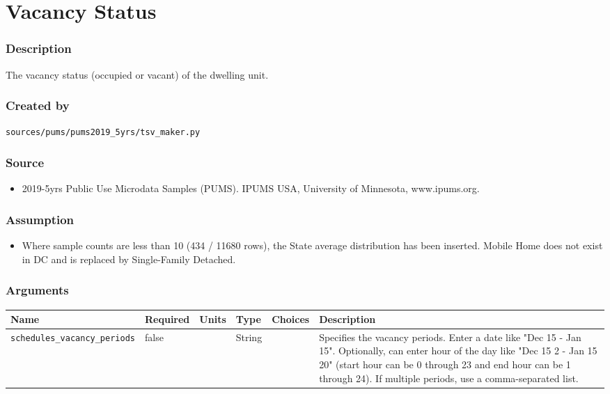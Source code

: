 \section{Vacancy Status}\label{vacancy_status}

\subsubsection{Description}\label{description-142}

The vacancy status (occupied or vacant) of the dwelling unit.

\subsubsection{Created by}\label{created-by-143}

\texttt{sources/pums/pums2019\_5yrs/tsv\_maker.py}

\subsubsection{Source}\label{source-145}

\begin{itemize}
 
\item
  2019-5yrs Public Use Microdata Samples (PUMS). IPUMS USA, University
  of Minnesota, www.ipums.org.
\end{itemize}

\subsubsection{Assumption}\label{assumption-81}

\begin{itemize}
 
\item
  Where sample counts are less than 10 (434 / 11680 rows), the State
  average distribution has been inserted. \textquotesingle Mobile
  Home\textquotesingle{} does not exist in DC and is replaced by
  \textquotesingle Single-Family Detached\textquotesingle.
\end{itemize}

\subsubsection{Arguments}\label{arguments-101}

\begin{longtable}[]{@{}llllll@{}}
\toprule\noalign{}
Name & Required & Units & Type & Choices & Description \\
\midrule\noalign{}
\endhead
\bottomrule\noalign{}
\endlastfoot
\texttt{schedules\_vacancy\_periods} & false & & String & & Specifies
the vacancy periods. Enter a date like "Dec 15 - Jan 15". Optionally,
can enter hour of the day like "Dec 15 2 - Jan 15 20" (start hour can be
0 through 23 and end hour can be 1 through 24). If multiple periods, use
a comma-separated list. \\
\end{longtable}

